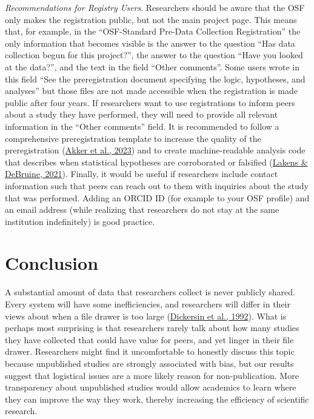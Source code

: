 \documentclass[
  ,jou, a4paper,floatsintext]{apa6}
\begin{document}
\emph{Recommendations for Registry Users}. Researchers should be aware that the OSF only makes the registration public, but not the main project page. This means that, for example, in the ``OSF-Standard Pre-Data Collection Registration'' the only information that becomes visible is the answer to the question ``Has data collection begun for this project?'', the answer to the question ``Have you looked at the data?'', and the text in the field ``Other comments''. Some users wrote in this field ``See the preregistration document specifying the logic, hypotheses, and analyses'' but those files are not made accessible when the registration is made public after four years. If researchers want to use registrations to inform peers about a study they have performed, they will need to provide all relevant information in the ``Other comments'' field. It is recommended to follow a comprehensive preregistration template to increase the quality of the preregistration (\protect\hyperlink{ref-akker_effectiveness_2023}{Akker et al., 2023}) and to create machine-readable analysis code that describes when statistical hypotheses are corroborated or falsified (\protect\hyperlink{ref-lakens_improving_2021}{Lakens \& DeBruine, 2021}). Finally, it would be useful if researchers include contact information such that peers can reach out to them with inquiries about the study that was performed. Adding an ORCID ID (for example to your OSF profile) and an email address (while realizing that researchers do not stay at the same institution indefinitely) is good practice.

\hypertarget{conclusion}{%
\section{Conclusion}\label{conclusion}}

A substantial amount of data that researchers collect is never publicly shared. Every system will have some inefficiencies, and researchers will differ in their views about when a file drawer is too large (\protect\hyperlink{ref-dickersin_factors_1992}{Dickersin et al., 1992}). What is perhaps most surprising is that researchers rarely talk about how many studies they have collected that could have value for peers, and yet linger in their file drawer. Researchers might find it uncomfortable to honestly discuss this topic because unpublished studies are strongly associated with bias, but our results suggest that logistical issues are a more likely reason for non-publication. More transparency about unpublished studies would allow academics to learn where they can improve the way they work, thereby increasing the efficiency of scientific research.
\end{document}
